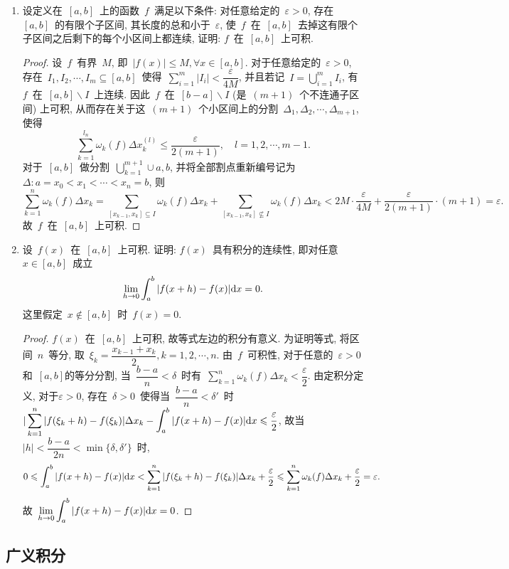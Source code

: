 \documentclass[UTF8,a4paper,20pt]{article}
\begin{document}
\begin{enumerate}
\item 设定义在~$[a,b]$~上的函数~$f$~满足以下条件: 对任意给定的~$\varepsilon>0$, 存在~$[a,b]$~的有限个子区间, 其长度的总和小于~$\varepsilon$, 使~$f$~在~$[a,b]$~去掉这有限个子区间之后剩下的每个小区间上都连续, 证明: $f$~在~$[a,b]$~上可积.
\begin{proof}
	设~$f$~有界~$M$, 即~$|f(x)|\leqslant M, \forall x \in [a,b]$. 对于任意给定的~$\varepsilon>0$, 存在~$I_1, I_2, \cdots, I_m\subseteq[a,b]$~使得~$\sum\limits_{i=1}^m|I_i|<\dfrac{\varepsilon}{4M}$, 并且若记~$I=\bigcup\limits_{i=1}^{m} I_i$, 有~$f$~在~$[a,b]\backslash I$~上连续. 因此~$f$~在~$[b-a]\backslash I$ (是~$(m+1)$~个不连通子区间) 上可积, 从而存在关于这~$(m+1)$~个小区间上的分割~$\Delta_{1}, \Delta_{2}, \cdots, \Delta_{m+1}$, 使得
\[\sum_{k=1}^{l_n}\omega_{k}(f)\Delta x_k^{(l)}\leqslant\dfrac{\varepsilon}{2(m+1)}, \quad l=1,2,\cdots, m-1.\]
对于~$[a,b]$~做分割~$\bigcup_{k=1}^{m+1}\cup{a,b}$, 并将全部割点重新编号记为~$\Delta: a=x_0<x_1<\cdots<x_n=b$, 则
\[\sum_{k=1}^n\omega_k(f)\Delta x_k=\sum_{[x_{k-1},x_k]\subseteq I}\omega_k(f)\Delta x_k+\sum_{[x_{k-1},x_k]\not\subseteq I}\omega_k(f)\Delta x_k< 2M\cdot \dfrac{\varepsilon}{4M}+\dfrac{\varepsilon}{2(m+1)}\cdot(m+1)=\varepsilon.\]
故~$f$~在~$[a,b]$~上可积.
\end{proof}

\item 设~$f(x)$~在~$[a,b]$~上可积. 证明: $f(x)$~具有积分的连续性, 即对任意~$x\in[a,b]$~成立
\[\lim_{h\to 0}\int_a^b|f(x+h)-f(x)|\mathrm{d}x=0.\]
这里假定~$x\notin [a,b]$~时~$f(x)=0$.
\begin{proof}
	$f(x)$~在~$[a,b]$~上可积, 故等式左边的积分有意义. 为证明等式, 将区间~$n$~等分, 取~$\xi_k=\dfrac{x_{k-1}+x_k}{2}, k=1,2,\cdots, n$. 由~$f$~可积性, 对于任意的~$\varepsilon>0$和~$[a,b]$的等分分割, 当~$\dfrac{b-a}{n}<\delta$~时有~$\sum\limits_{k=1}^n \omega_k(f)\Delta x_k<\dfrac{\varepsilon}{2}$. 由定积分定义, 对于$\varepsilon>0$, 存在~$\delta>0$~使得当~$\dfrac{b-a}{n}<\delta'$~时$\displaystyle |\sum\limits_{k=1}^n |f(\xi_k+h)-f(\xi_k)|\Delta x_k-\int_a^b|f(x+h)-f(x)|\mathrm{d}x\leqslant \dfrac{\varepsilon}{2}$, 故当~$|h|<\dfrac{b-a}{2n}<\min\{\delta,\delta'\}$~时,
\[0\leqslant\int_a^b |f(x+h)-f(x)|\mathrm{d}x<\sum_{k=1}^{n} |f(\xi_k+h)-f(\xi_k)|\Delta x_k+\dfrac{\varepsilon}{2}\leqslant \sum_{k=1}^{n}\omega_k(f)\Delta x_k+\dfrac{\varepsilon}{2}=\varepsilon.\]
故~$\displaystyle\lim_{h\to 0}\int_a^b|f(x+h)-f(x)|\mathrm{d}x=0$.
\end{proof}
\end{enumerate}

\clearpage
\subsection{广义积分}
\end{document}
